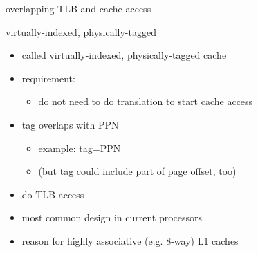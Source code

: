 \begin{frame}{overlapping TLB and cache access}
\end{frame}

\begin{frame}{virtually-indexed, physically-tagged}
\begin{itemize}
    \item called virtually-indexed, physically-tagged cache
    \item requirement: 
        \begin{itemize}
        \item do not need to do translation to start cache access
        \end{itemize}
    \item tag overlaps with PPN
        \begin{itemize}
        \item example: tag=PPN
        \item (but tag could include part of page offset, too)
        \end{itemize}
    \item do TLB access 
    \vspace{.5cm}
    \item most common design in current processors
    \item reason for highly associative (e.g. 8-way) L1 caches
\end{itemize}
\end{frame}
